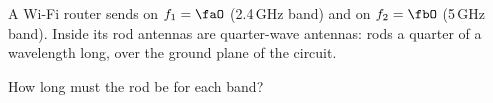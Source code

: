 A Wi-Fi router sends on $f_1 = \faO$ (2.4\,GHz band) and on $f_2 = \fbO$ (5\,GHz band). Inside its rod antennas are quarter-wave antennas: rods a quarter of a wavelength long, over the ground plane of the circuit.

How long must the rod be for each band?
